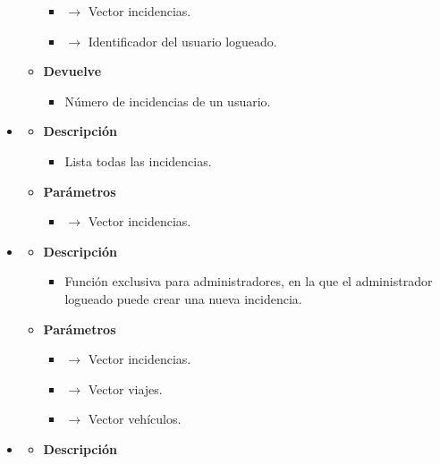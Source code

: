 \begin{itemize}
\begin{itemize}
\begin{itemize}
			\item {} $\rightarrow$ Vector incidencias.
            \item {} $\rightarrow$ Identificador del usuario logueado.
		\end{itemize}
        \item \textbf{Devuelve}
		\begin{itemize}
			\item Número de incidencias de un usuario.
		\end{itemize}
	\end{itemize}
    \item{}
	\begin{itemize}
		\item \textbf{Descripción}
        \begin{itemize}
			\item Lista todas las incidencias.
		\end{itemize}
        \item \textbf{Parámetros}
		\begin{itemize}
			\item {} $\rightarrow$ Vector incidencias.
		\end{itemize}
	\end{itemize}
	\item{}
	\begin{itemize}
		\item \textbf{Descripción}
        \begin{itemize}
			\item Función exclusiva para administradores, en la que el administrador logueado puede crear una nueva incidencia.
		\end{itemize}
        \item \textbf{Parámetros}
		\begin{itemize}
			\item {} $\rightarrow$ Vector incidencias.
            \item {} $\rightarrow$ Vector viajes.
            \item {} $\rightarrow$ Vector vehículos.
		\end{itemize}
	\end{itemize}
    \item{}
	\begin{itemize}
		\item \textbf{Descripción}

\end{itemize}
\end{itemize}
